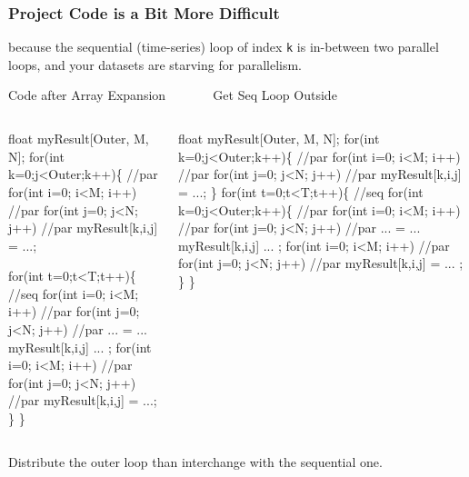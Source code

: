 \documentclass{beamer}
\newcommand{\emp}[1]{\textcolor{DikuRed}{ #1}}
\newcommand{\emphh}[1]{\textcolor{CosGreen}{ #1}}
\begin{document}
\begin{frame}[fragile,t]
  \frametitle{Project Code is a Bit More Difficult} %

because the sequential (time-series) loop of index {\tt k} is in-between
two parallel loops, and your datasets are starving for parallelism.\smallskip


\begin{block}{Code after Array Expansion {\tt~~~~~~} Get Seq Loop Outside}
\begin{columns}
\begin{colorcode}
float myResult[Outer, M, N];
\emphh{for(int k=0;j<Outer;k++)\{ //par}
    \emphh{for(int i=0; i<M; i++) //par}
      \emphh{for(int j=0; j<N; j++) //par}
        \emp{myResult[k,i,j] = ...;}

    \emp{for(int t=0;t<T;t++)\{ //seq}
      \emphh{for(int i=0; i<M; i++) //par}
        \emphh{for(int j=0; j<N; j++) //par}
          ... = ... \emp{myResult[k,i,j]} ... ;
      \emphh{for(int i=0; i<M; i++) //par}
        \emp{for(int j=0; j<N; j++) //par}
          \emp{myResult[k,i,j] = ...;}
    \emp{\}} 
\emphh{\}}
\end{colorcode}
\begin{colorcode}
float myResult[Outer, M, N];
\emphh{for(int k=0;j<Outer;k++)\{ //par}
  \emphh{for(int i=0; i<M; i++) //par}
    \emphh{for(int j=0; j<N; j++) //par}
      \emp{myResult[k,i,j] = ...;}
\}
\emp{for(int t=0;t<T;t++)\{ //seq}
  \emphh{for(int k=0;j<Outer;k++)\{ //par}
      \emphh{for(int i=0; i<M; i++) //par}
        \emphh{for(int j=0; j<N; j++) //par}
          ... = ... \emp{myResult[k,i,j]} ... ;
      \emphh{for(int i=0; i<M; i++) //par}
        \emp{for(int j=0; j<N; j++) //par}
          \emp{myResult[k,i,j] = ... ;}
\emp{\}} \emphh{\}} 
\end{colorcode}
\end{columns}
\end{block} 
\medskip

Distribute the outer loop than interchange with the sequential one.

\end{frame}
\end{document}
